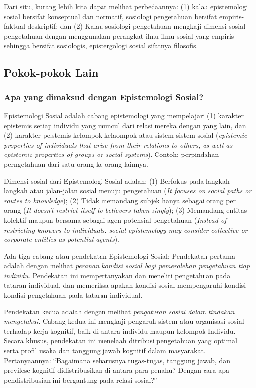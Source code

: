 \documentclass[11pt,twoside,a5paper,openany]{memoir}
\begin{document}
Dari situ, kurang lebih kita dapat melihat perbedaannya: (1) kalau
epistemologi sosial bersifat konseptual dan normatif, sosiologi
pengetahuan bersifat empiris-faktual-deskriptif; dan (2) Kalau sosiologi
pengetahuan mengkaji dimensi sosial pengetahuan dengan menggunakan
perangkat ilmu-ilmu sosial yang empiris sehingga bersifat sosiologis,
epistergologi sosial sifatnya filosofis.

\hypertarget{pokok-pokok-lain-2}{%
\subsection{Pokok-pokok Lain}\label{pokok-pokok-lain-2}}

\hypertarget{apa-yang-dimaksud-dengan-epistemologi-sosial}{%
\subsubsection{Apa yang dimaksud dengan Epistemologi
Sosial?}\label{apa-yang-dimaksud-dengan-epistemologi-sosial}}

Epistemologi Sosial adalah cabang epistemologi yang mempelajari (1)
karakter epistemis setiap individu yang muncul dari relasi mereka dengan
yang lain, dan (2) karakter pelstemis kelompok-kelaompok atau
sistem-sistem sosial (\emph{epistemic properties of individuals that
arise from their relations to others, as well as epistemic properties of
groups or social systems}). Contoh: perpindahan perngetahuan dari satu
orang ke orang lainnya.

Dimensi sosial dari Epistemologi Sosial adalah: (1) Berfokus pada
langkah-langkah atau jalan-jalan sosial menuju pengetahuan (\emph{It
focuses on social paths or routes to knowledge}); (2) Tidak memandang
subjek hanya sebagai orang per orang (\emph{It doesn't restrict itself
to believers taken singly}); (3) Memandang entitas kolektif maupun
bersama sebagai agen potensial pengetahuan (\emph{Instead of restricting
knowers to individuals, social epistemology may consider collective or
corporate entities as potential agents}).

Ada tiga cabang atau pendekatan Epistemologi Sosial: Pendekatan pertama
adalah dengan melihat \emph{peranan kondisi sosial bagi pemerolehan
pengetahuan tiap individu}. Pendekatan ini mempertanyakan dan meneliti
pengetahuan pada tataran individual, dan memeriksa apakah kondisi sosial
mempengaruhi kondisi-kondisi pengetahuan pada tataran individual.

Pendekatan kedua adalah dengan melihat \emph{pengaturan sosial dalam
tindakan mengetahui}. Cabang kedua ini mengkaji pengaruh sistem atau
organisasi sosial terhadap kerja kognitif, baik di antara individu
maupun kelompok Individu. Secara khusus, pendekatan ini menelaah
ditribusi pengetahuan yang optimal serta profil usaha dan tanggung jawab
kognitif dalam masyarakat. Pertanyaannya: ``Bagaimana seharusnya
tugas-tugas, tanggung jawab, dan previlese kognitif didistribusikan di
antara para penahu? Dengan cara apa pendistribusian ini bergantung pada
relasi sosial?''
\end{document}
